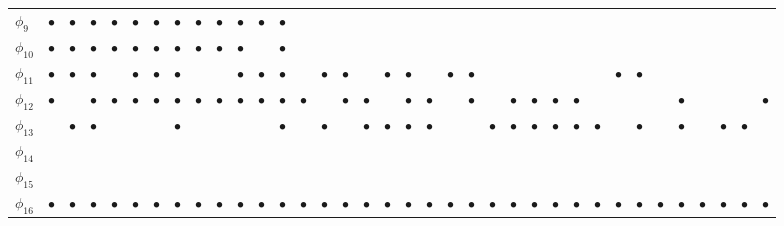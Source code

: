 {\begin{tabularx}{.9\columnwidth}{|X|ccccccccccccccccccccccccccccccccccc|}
$\phi_9$ & $\bullet$ & $\bullet$ & $\bullet$ & $\bullet$ & $\bullet$ & $\bullet$ & $\bullet$ & $\bullet$ & $\bullet$ & $\bullet$ & $\bullet$ & $\bullet$ &   &   &   &   &   &   &   &   &   &   &   &   &   &   &   &   &   &   &   &   &   &   &  \\
$\phi_{10}$ & $\bullet$ & $\bullet$ & $\bullet$ & $\bullet$ & $\bullet$ & $\bullet$ & $\bullet$ & $\bullet$ & $\bullet$ & $\bullet$ &   & $\bullet$ &   &   &   &   &   &   &   &   &   &   &   &   &   &   &   &   &   &   &   &   &   &   &  \\
$\phi_{11}$ & $\bullet$ & $\bullet$ & $\bullet$ &   & $\bullet$ & $\bullet$ & $\bullet$ &   &   & $\bullet$ & $\bullet$ & $\bullet$ &   & $\bullet$ & $\bullet$ &   & $\bullet$ & $\bullet$ &   & $\bullet$ & $\bullet$ &   &   &   &   &   &   & $\bullet$ & $\bullet$ &   &   &   &   &   &  \\
$\phi_{12}$ & $\bullet$ &   & $\bullet$ & $\bullet$ & $\bullet$ & $\bullet$ & $\bullet$ & $\bullet$ & $\bullet$ & $\bullet$ & $\bullet$ & $\bullet$ & $\bullet$ &   & $\bullet$ & $\bullet$ &   & $\bullet$ & $\bullet$ &   & $\bullet$ &   & $\bullet$ & $\bullet$ & $\bullet$ & $\bullet$ &   &   &   &   & $\bullet$ &   &   &   & $\bullet$\\
$\phi_{13}$ &   & $\bullet$ & $\bullet$ &   &   &   & $\bullet$ &   &   &   &   & $\bullet$ &   & $\bullet$ &   & $\bullet$ & $\bullet$ & $\bullet$ & $\bullet$ &   &   & $\bullet$ & $\bullet$ & $\bullet$ & $\bullet$ & $\bullet$ & $\bullet$ &   & $\bullet$ &   & $\bullet$ &   & $\bullet$ & $\bullet$ &  \\
$\phi_{14}$ &   &   &   &   &   &   &   &   &   &   &   &   &   &   &   &   &   &   &   &   &   &   &   &   &   &   &   &   &   &   &   &   &   &   &  \\
$\phi_{15}$ &   &   &   &   &   &   &   &   &   &   &   &   &   &   &   &   &   &   &   &   &   &   &   &   &   &   &   &   &   &   &   &   &   &   &  \\
$\phi_{16}$ & $\bullet$ & $\bullet$ & $\bullet$ & $\bullet$ & $\bullet$ & $\bullet$ & $\bullet$ & $\bullet$ & $\bullet$ & $\bullet$ & $\bullet$ & $\bullet$ & $\bullet$ & $\bullet$ & $\bullet$ & $\bullet$ & $\bullet$ & $\bullet$ & $\bullet$ & $\bullet$ & $\bullet$ & $\bullet$ & $\bullet$ & $\bullet$ & $\bullet$ & $\bullet$ & $\bullet$ & $\bullet$ & $\bullet$ & $\bullet$ & $\bullet$ & $\bullet$ & $\bullet$ & $\bullet$ & $\bullet$ \\
\hline\hline
\end{tabularx}}